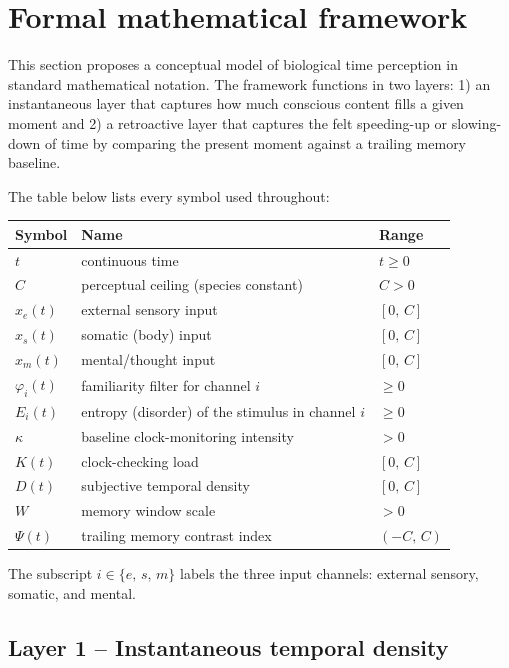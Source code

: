 \documentclass[11pt,a4paper]{article}
\begin{document}
\section{Formal mathematical framework}

This section proposes a conceptual model of biological time perception in standard mathematical notation. The framework functions in two layers: 1) an instantaneous layer that captures how much conscious content fills a given moment and 2) a retroactive layer that captures the felt speeding-up or slowing-down of time by comparing the present moment against a trailing memory baseline.

\medskip

The table below lists every symbol used throughout:

\begin{center}
	\renewcommand{\arraystretch}{1.3}
	\begin{tabular}{@{}lll@{}}
		\toprule
		Symbol & Name & Range \\
		\midrule
		$t$ & continuous time & $t \ge 0$ \\
		$C$ & perceptual ceiling (species constant) & $C > 0$ \\
		$x_e(t)$ & external sensory input & $[0,\,C]$ \\
		$x_s(t)$ & somatic (body) input & $[0,\,C]$ \\
		$x_m(t)$ & mental/thought input & $[0,\,C]$ \\
		$\varphi_i(t)$ & familiarity filter for channel $i$ & $\ge 0$ \\
		$E_i(t)$ & entropy (disorder) of the stimulus in channel $i$ & $\ge 0$ \\
		$\kappa$ & baseline clock-monitoring intensity & $> 0$ \\
		$K(t)$ & clock-checking load & $[0,\,C]$ \\
		$D(t)$ & subjective temporal density & $[0,\,C]$ \\
		$W$ & memory window scale & $> 0$ \\
		$\Psi(t)$ & trailing memory contrast index & $(-C,\,C)$ \\
		\bottomrule
	\end{tabular}
\end{center}

The subscript $i \in \{e,\,s,\,m\}$ labels the three input channels: external sensory, somatic, and mental.

\subsection{Layer 1 -- Instantaneous temporal density}
\end{document}
